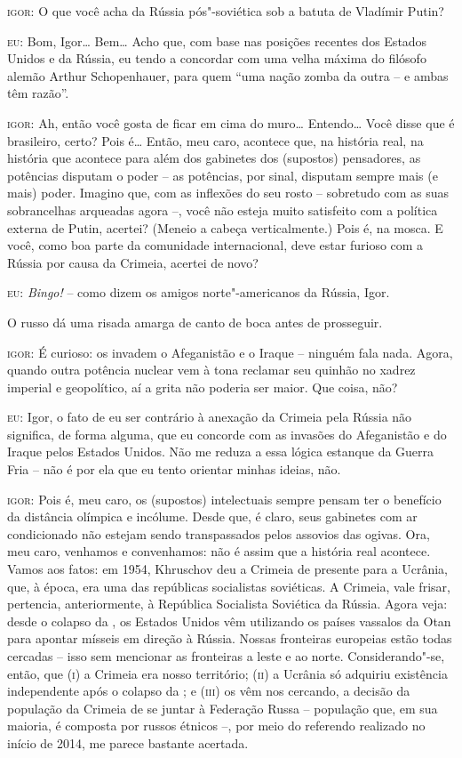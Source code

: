 \textsc{igor:} O que você acha da Rússia pós"-soviética sob a batuta de
Vladímir Putin?

\textsc{eu:} Bom, Igor\ldots{} Bem\ldots{} Acho que, com base nas posições
recentes dos Estados Unidos e da Rússia, eu tendo a concordar com uma
velha máxima do filósofo alemão Arthur Schopenhauer, para quem ``uma
nação zomba da outra -- e ambas têm razão''.

\textsc{igor:} Ah, então você gosta de ficar em cima do muro\ldots{}
Entendo\ldots{} Você disse que é brasileiro, certo? Pois é\ldots{} Então, meu
caro, acontece que, na história real, na história que acontece para além
dos gabinetes dos (supostos) pensadores, as potências disputam o poder
-- as potências, por sinal, disputam sempre mais (e mais) poder. Imagino
que, com as inflexões do seu rosto -- sobretudo com as suas sobrancelhas
arqueadas agora --, você não esteja muito satisfeito com a política
externa de Putin, acertei? (Meneio a cabeça verticalmente.) Pois é, na
mosca. E você, como boa parte da comunidade internacional, deve estar
furioso com a Rússia por causa da Crimeia, acertei de novo?

\textsc{eu:} \emph{Bingo!} -- como dizem os amigos norte"-americanos da
Rússia, Igor.

O russo dá uma risada amarga de canto de boca antes de prosseguir.

\textsc{igor:} É curioso: os  invadem o Afeganistão e o Iraque --
ninguém fala nada. Agora, quando outra potência nuclear vem à tona
reclamar seu quinhão no xadrez imperial e geopolítico, aí a grita não
poderia ser maior. Que coisa, não?

\textsc{eu:} Igor, o fato de eu ser contrário à anexação da Crimeia pela
Rússia não significa, de forma alguma, que eu concorde com as invasões
do Afeganistão e do Iraque pelos Estados Unidos. Não me reduza a essa
lógica estanque da Guerra Fria -- não é por ela que eu tento orientar
minhas ideias, não.

\textsc{igor:} Pois é, meu caro, os (supostos) intelectuais sempre
pensam ter o benefício da distância olímpica e incólume. Desde que, é
claro, seus gabinetes com ar condicionado não estejam sendo
transpassados pelos assovios das ogivas. Ora, meu caro, venhamos e
convenhamos: não é assim que a história real acontece. Vamos aos fatos:
em 1954, Khruschov deu a Crimeia de presente para a Ucrânia, que, à
época, era uma das repúblicas socialistas soviéticas. A Crimeia, vale
frisar, pertencia, anteriormente, à República Socialista Soviética da
Rússia. Agora veja: desde o colapso da , os Estados Unidos vêm
utilizando os países vassalos da Otan para apontar mísseis em direção à
Rússia. Nossas fronteiras europeias estão todas cercadas -- isso sem
mencionar as fronteiras a leste e ao norte. Considerando"-se, então, que
\textsc{(i)} a Crimeia era nosso território; \textsc{(ii)} a Ucrânia só
adquiriu existência independente após o colapso da ; e
\textsc{(iii)} os  vêm nos cercando, a decisão da população da
Crimeia de se juntar à Federação Russa -- população que, em sua maioria,
é composta por russos étnicos --, por meio do referendo realizado no
início de 2014, me parece bastante acertada.

